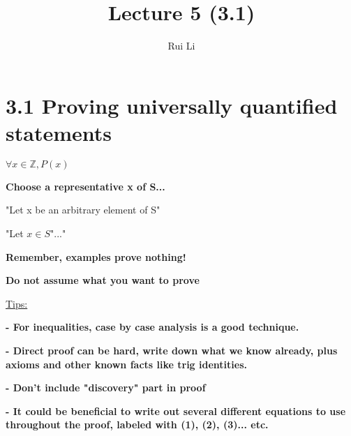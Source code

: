 \documentclass[11pt]{article}
\title{Lecture 5 (3.1)}
\author{Rui Li}
\begin{document}
\maketitle
\tableofcontents

\section*{3.1 Proving universally quantified statements}

$\forall x \in \mathbb{Z}, P(x)$

\medskip

\textbf{Choose a representative x of S...}

"Let x be an arbitrary element of S"

"Let $x \in S$"..."

\medskip

\textbf{Remember, examples prove nothing!}

\medskip

\textbf{Do not assume what you want to prove}

\medskip

\underline{Tips:}

\textbf{- For inequalities, case by case analysis is a good technique.}

\textbf{- Direct proof can be hard, write down what we know already, plus axioms and other known facts like trig identities.}

\textbf{- Don't include "discovery" part in proof}

\textbf{- It could be beneficial to write out several different equations to use throughout the proof, labeled with (1), (2), (3)... etc.}
\end{document}
